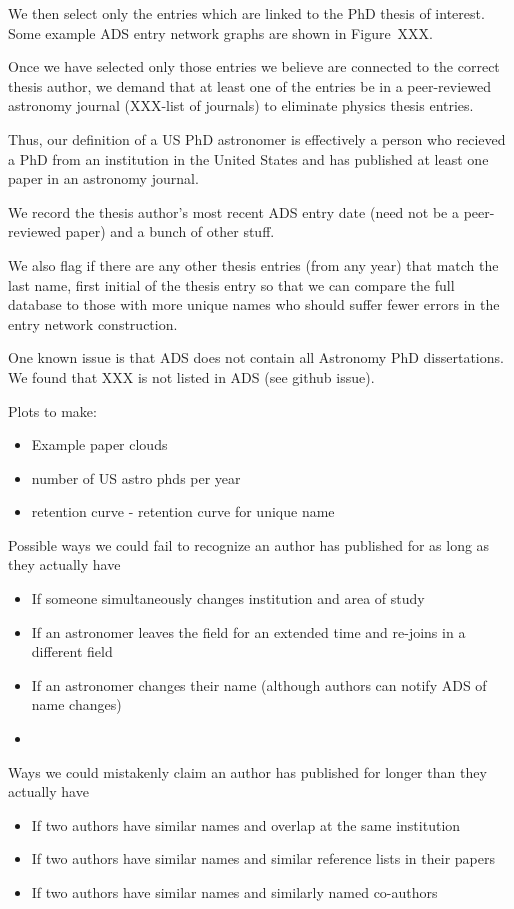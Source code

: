 \documentclass{emulateapj}
\begin{document}
We then select only the entries which are linked to the PhD thesis of interest.  Some example ADS entry network graphs are shown in Figure~XXX.

Once we have selected only those entries we believe are connected to the correct thesis author, we demand that at least one of the entries be in a peer-reviewed astronomy journal (XXX-list of journals) to eliminate physics thesis entries.

Thus, our definition of a US PhD astronomer is effectively a person who recieved a PhD from an institution in the United States and has published at least one paper in an astronomy journal.

We record the thesis author's most recent ADS entry date (need not be a peer-reviewed paper)  and a bunch of other stuff.

We also flag if there are any other thesis entries (from any year) that match the last name, first initial of the thesis entry so that we can compare the full database to those with more unique names who should suffer fewer errors in the entry network construction.

One known issue is that ADS does not contain all Astronomy PhD dissertations. We found that XXX is not listed in ADS (see github issue).


Plots to make:
\begin{itemize}
\item{Example paper clouds}
\item{number of US astro phds per year}
  \item{retention curve - retention curve for unique name}
\end{itemize}




Possible ways we could fail to recognize an author has published for as long as they actually have
\begin{itemize}
\item{If someone simultaneously changes institution and area of study}
  \item{If an astronomer leaves the field for an extended time and re-joins in a different field}
\item{If an astronomer changes their name (although authors can notify ADS of name changes)}
  \item{}
\end{itemize}

Ways we could mistakenly claim an author has published for longer than they actually have
\begin{itemize}
\item{If two authors have similar names and overlap at the same institution}
\item{If two authors have similar names and similar reference lists in their papers}
  \item{If two authors have similar names and similarly named co-authors}
\end{itemize}
\end{document}
